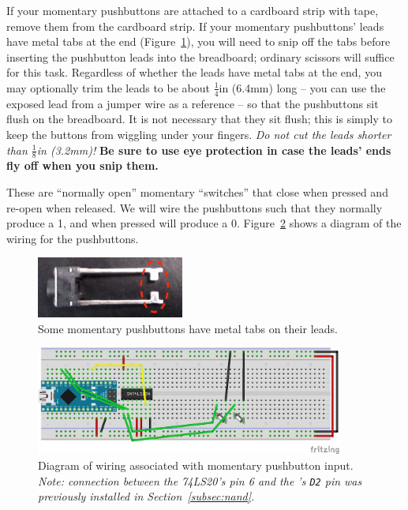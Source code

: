 If your momentary pushbuttons are attached to a cardboard strip with tape, remove them from the cardboard strip.
If your momentary pushbuttons' leads have metal tabs at the end (Figure~\ref{fig:pushbutton-tabs}), you will need to snip off the tabs before inserting the pushbutton leads into the breadboard;
ordinary scissors will suffice for this task.
Regardless of whether the leads have metal tabs at the end, you may optionally trim the leads to be about $\frac{1}{4}$in (6.4mm) long -- you can use the exposed lead from a jumper wire as a reference -- so that the pushbuttons sit flush on the breadboard.
It is not necessary that they sit flush;
this is simply to keep the buttons from wiggling under your fingers.
\textit{Do not cut the leads shorter than $\mathit{\frac{1}{8}}$in (3.2mm)!}
\textbf{Be sure to use eye protection in case the leads' ends fly off when you snip them.}

These are ``normally open'' momentary ``switches'' that close when pressed and re-open when released.
We will wire the pushbuttons such that they normally produce a 1, and when pressed will produce a 0.
Figure~\ref{fig:pushbutton-diagram} shows a diagram of the wiring for the pushbuttons.

\begin{figure}
    \centering
    \includegraphics[height=2cm]{direct/buttons/pushbutton-tabs}
    \caption{Some momentary pushbuttons have metal tabs on their leads.\label{fig:pushbutton-tabs}}
\end{figure}

\begin{figure}
    \centering
    \includegraphics[width=0.9\textwidth]{fritzing_diagrams/pushbutton}
    \caption{Diagram of wiring associated with momentary pushbutton input.
        \textit{Note: connection between the 74LS20's pin 6 and the \developmentboard's
        \texttt{D2} pin was previously installed in Section~\ref{subsec:nand}.}
        \label{fig:pushbutton-diagram}}
\end{figure}

